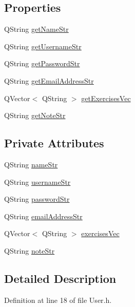 \subsection*{Properties}
\begin{DoxyCompactItemize}
\item 
Q\-String \hyperlink{class_user_aff5d8481b6710290eb9782a3eea47a29}{get\-Name\-Str}
\item 
Q\-String \hyperlink{class_user_a6b3ceae4978abc4d9e9c6c4c34222e88}{get\-Username\-Str}
\item 
Q\-String \hyperlink{class_user_aef3f929e80bfd33f8cf6dbc3f6841462}{get\-Password\-Str}
\item 
Q\-String \hyperlink{class_user_af4a625ca8127b47eb2682d68d0c28004}{get\-Email\-Address\-Str}
\item 
Q\-Vector$<$ Q\-String $>$ \hyperlink{class_user_a2035ad99a92537a04aa8025e536096d4}{get\-Exercises\-Vec}
\item 
Q\-String \hyperlink{class_user_ab12c4e0a681f1feed774cb611f5c36a5}{get\-Note\-Str}
\end{DoxyCompactItemize}
\subsection*{Private Attributes}
\begin{DoxyCompactItemize}
\item 
Q\-String \hyperlink{class_user_aca80d105a91d9bf8e04fccb4aed742af}{name\-Str}
\item 
Q\-String \hyperlink{class_user_aa05f77ad89b778912aa5c0d87ddf532a}{username\-Str}
\item 
Q\-String \hyperlink{class_user_af5db2defeb3591fe79226d3fcf7393e7}{password\-Str}
\item 
Q\-String \hyperlink{class_user_ac061140cfc7876f2a7433af74ac0cbab}{email\-Address\-Str}
\item 
Q\-Vector$<$ Q\-String $>$ \hyperlink{class_user_ab57f1403a6cb697291cd8bc77c94918a}{exercises\-Vec}
\item 
Q\-String \hyperlink{class_user_a94d574465f1be71d870dbf716ca4ffe1}{note\-Str}
\end{DoxyCompactItemize}


\subsection{Detailed Description}


Definition at line 18 of file User.\-h.



